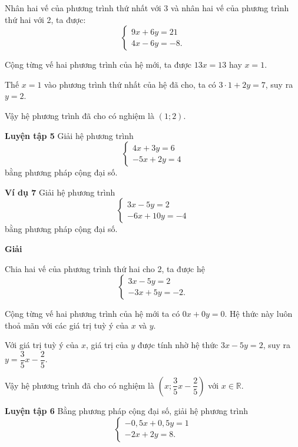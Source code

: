 \begin{lesson}
    Nhân hai vế của phương trình thứ nhất với 3 và nhân hai vế của phương trình thứ hai với 2, ta được:
    \[
        \begin{cases}
            9x+6y=21\\
            4x-6y=-8.
        \end{cases}
    \]

    Cộng từng vế hai phương trình của hệ mới, ta được $13x=13$ hay $x=1$.

    Thế $x=1$ vào phương trình thứ nhất của hệ đã cho, ta có $3\cdot1+2y=7$, suy ra $y=2$.

    Vậy hệ phương trình đã cho có nghiệm là $(1;2)$.

    \textbf{Luyện tập 5} Giải hệ phương trình
    \[
        \begin{cases}
            4x+3y=6\\
            -5x+2y=4
        \end{cases}
    \]
    bằng phương pháp cộng đại số.

    \answerline
    \answerline
    \answerline

    \textbf{Ví dụ 7} Giải hệ phương trình
    \[
        \begin{cases}
            3x-5y=2\\
            -6x+10y=-4
        \end{cases}
    \]
    bằng phương pháp cộng đại số.

    \textbf{Giải}

    Chia hai vế của phương trình thứ hai cho 2, ta được hệ
    \[
        \begin{cases}
            3x-5y=2\\
            -3x+5y=-2.
        \end{cases}
    \]

    Cộng từng vế hai phương trình của hệ mới ta có $0x+0y=0$. Hệ thức này luôn thoả mãn với các giá trị tuỳ ý của $x$ và $y$.

    Với giá trị tuỳ ý của $x$, giá trị của $y$ được tính nhờ hệ thức $3x-5y=2$, suy ra $y=\dfrac{3}{5}x-\dfrac{2}{5}$.

    Vậy hệ phương trình đã cho có nghiệm là $\left(x;\dfrac{3}{5}x-\dfrac{2}{5}\right)$ với $x\in\mathbb{R}$.

    \textbf{Luyện tập 6} Bằng phương pháp cộng đại số, giải hệ phương trình
    \[
        \begin{cases}
            -0{,}5x+0{,}5y=1\\
            -2x+2y=8.
        \end{cases}
    \]


\end{lesson}
